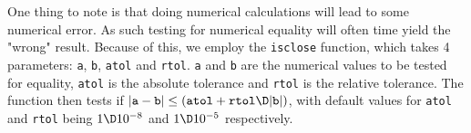 \documentclass[main.tex]{subfiles}
\begin{document}
	One thing to note is that doing numerical calculations will lead to some numerical error. As such testing for numerical equality will often time yield the "wrong" result. Because of this, we employ the \texttt{isclose} function, which takes 4 parameters: \texttt{a}, \texttt{b}, \texttt{atol} and \texttt{rtol}. \texttt{a} and \texttt{b} are the numerical values to be tested for equality, \texttt{atol} is the absolute tolerance and \texttt{rtol} is the relative tolerance. The function then tests if $|\texttt{a}-\texttt{b}| \leq (\texttt{atol}+ \texttt{rtol} \D |\texttt{b}|)$, with default values for \texttt{atol} and \texttt{rtol} being $ 1 \D 10^{-8} $ and $ 1 \D 10^{-5} $ respectively.
	
	
	
\end{document}
